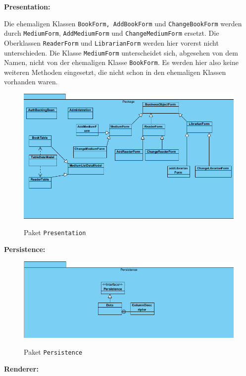 \documentclass[fontsize=12pt,paper=a4,twoside]{scrartcl}
\begin{document}
\textbf{Presentation:}

Die ehemaligen Klassen \texttt{BookForm, AddBookForm} und \texttt{ChangeBookForm} werden durch \texttt{MediumForm}, \texttt{AddMediumForm} und \texttt{ChangeMediumForm} ersetzt. Die Oberklassen \texttt{ReaderForm} und \texttt{LibrarianForm} werden hier vorerst nicht unterschieden. Die Klasse \texttt{MediumForm} unterscheidet sich, abgesehen von dem Namen, nicht von der ehemaligen Klasse \texttt{BookForm}. Es werden hier also keine weiteren Methoden eingesetzt, die nicht schon in den ehemaligen Klassen vorhanden waren.

\begin{figure} [H] 
\caption{Paket \texttt{Presentation}} \centering
 \includegraphics[width=1\textwidth]{Diagramme/Presentation.png} 
 \label{Presentation} 
\end{figure}

\textbf{Persistence:}

\begin{figure} [H] 
\caption{Paket \texttt{Persistence}} \centering
 \includegraphics[width=1\textwidth]{Diagramme/Persistence.png} 
 \label{Persistence} 
\end{figure}
\newpage

\textbf{Renderer:}
\end{document}
